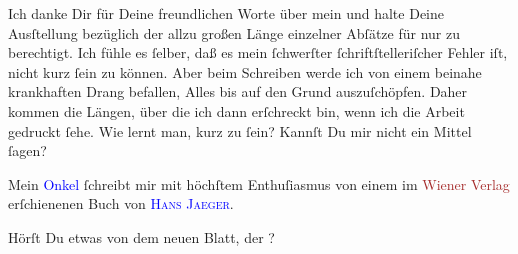 \pstart
           Ich danke Dir für Deine freundlichen Worte über mein \label{K_L03198-8v}\label{K_L03198-8h} und halte Deine Ausſtellung bezüglich der
               allzu großen Länge einzelner Abſätze für nur zu berechtigt. Ich fühle es ſelber, daß
               es mein ſchwerſter ſchriftſtelleriſcher Fehler iſt, nicht kurz ſein zu können. Aber
               beim Schreiben werde ich von einem beinahe krankhaften Drang befallen, Alles bis auf
               den Grund auszuſchöpfen. {\pb}Daher kommen die Längen,
               über die ich dann erſchreckt bin, wenn ich die Arbeit gedruckt ſehe. Wie lernt man,
               kurz zu ſein? Kannſt Du mir nicht ein Mittel ſagen?\pend
           
\pstart
           Mein \textcolor{blue}{Onkel}{}\ledrightnote{{$\rightarrow$}\textcolor{blue}{Fedor Mamroth}} ſchreibt mir mit
               höchſtem Enthuſiasmus von einem im \textcolor{brown}{Wiener Verlag}{}\ledrightnote{\textcolor{brown}{Wiener Verlag}}
               erſchienenen Buch \label{K_L03198-9v}\label{K_L03198-9h} von
                  \textsc{\textcolor{blue}{Hans Jaeger}{}\ledrightnote{\textcolor{blue}{Hans Jæger}}}.\pend
           
\pstart
           Hörſt Du etwas von dem neuen Blatt, der \label{K_L03198-123v}\label{K_L03198-123h}?\pend
           
